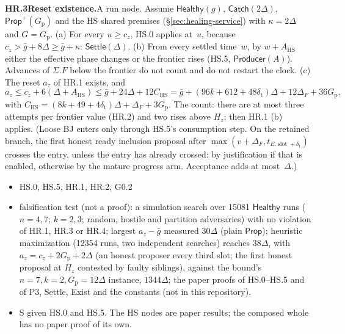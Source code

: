 \documentclass{article}
\newcommand{\slot}{\operatorname{slot}}
\newcommand{\dagnode}[6]{%
\par\medskip\noindent\textbf{#1\enspace #2.}\enspace #3
\begin{itemize}[leftmargin=2.2em,itemsep=0pt,topsep=2pt]
\item[\emph{Uses}] #4
\item[\emph{Evid.}] #5
\item[\emph{Task}] #6
\end{itemize}}
\begin{document}
\dagnode{HR.3}{Reset existence}{A run node.  Assume $\mathsf{Healthy}(g)$,
$\mathsf{Catch}(2\Delta)$, $\mathsf{Prop}^{+}(G_{\mathrm p})$ and the HS
shared premises (\S\ref{sec:healing-service}) with $\kappa=2\Delta$ and
$G=G_{\mathrm p}$.
(a) For every $u\geq c_z$, HS.0 applies at~$u$, because
$c_z>\bar g+8\Delta\geq\bar g+\kappa$: $\mathsf{Settle}(\Delta)$.
(b) From every settled time~$w$, by $w+A_{\mathrm{HS}}$ either the effective
phase changes or the frontier rises (HS.5, $\mathsf{Producer}(A)$).
Advances of $\Sigma.F$ below the frontier do not count and do not restart
the clock.
(c) The reset $a_z$ of HR.1 exists, and
\[
a_z\leq c_z+6(\Delta+A_{\mathrm{HS}})\leq\bar g+24\Delta+12C_{\mathrm{HS}}
=\bar g+(96k+612+48\delta_{\mathrm t})\Delta+12\Delta_F+36G_{\mathrm p},
\]
with $C_{\mathrm{HS}}=(8k+49+4\delta_{\mathrm t})\Delta+\Delta_F+3G_{\mathrm p}$.
The count: there are at most three attempts per frontier value (HR.2) and
two rises above $H_z$; then HR.1 (b) applies.
(Loose BJ enters only through HS.5's consumption step.  On the retained
branch, the first honest ready inclusion proposal after
$\max(v+\Delta_F,t_{E.\slot+\delta_{\mathrm t}})$ crosses the entry, unless
the entry has already crossed: by justification if that is enabled,
otherwise by the mature progress arm.  Acceptance adds at most~$\Delta$.)}
{HS.0, HS.5, HR.1, HR.2, G0.2}
{falsification test (not a proof): a simulation search over 15081
$\mathsf{Healthy}$ runs ($n=4,7$; $k=2,3$; random,
hostile and partition adversaries) with no violation of HR.1, HR.3 or HR.4;
largest $a_z-\bar g$ measured $30\Delta$ (plain $\mathsf{Prop}$);
heuristic maximization (12354 runs, two independent searches) reaches $38\Delta$, with
$a_z=c_z+2G_{\mathrm p}+2\Delta$ (an honest proposer every third slot; the
first honest proposal at $H_z$ contested by faulty siblings), against the
bound's $n=7,k=2,G_{\mathrm p}=12\Delta$ instance, $1344\Delta$;
the paper proofs of HS.0--HS.5 and of P3, Settle, Exist and the constants
(not in this repository).}
{S given HS.0 and HS.5.  The HS nodes are paper results; the composed whole
has no paper proof of its own.}
\end{document}
